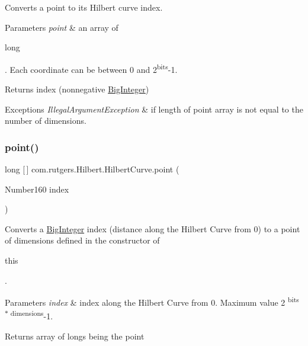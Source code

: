 Converts a point to its Hilbert curve index.


\begin{DoxyParams}{Parameters}
{\em point} & an array of
\begin{DoxyCode}
\textcolor{keywordtype}{long} 
\end{DoxyCode}
 . Each coordinate can be between 0 and 2\textsuperscript{bits}-\/1. \\
\hline
\end{DoxyParams}
\begin{DoxyReturn}{Returns}
index (nonnegative \hyperlink{}{Big\+Integer}) 
\end{DoxyReturn}

\begin{DoxyExceptions}{Exceptions}
{\em Illegal\+Argument\+Exception} & if length of point array is not equal to the number of dimensions. \\
\hline
\end{DoxyExceptions}
\mbox{\label{classcom_1_1rutgers_1_1Hilbert_1_1HilbertCurve_ad3b9f221c5c8e9bada057c09ecb4f8cd}} 
\subsubsection{\texorpdfstring{point()}{point()}\hspace{0.1cm}{\footnotesize\ttfamily [1/2]}}
{\footnotesize\ttfamily long \mbox{[}$\,$\mbox{]} com.\+rutgers.\+Hilbert.\+Hilbert\+Curve.\+point (\begin{DoxyParamCaption}\item[{Number160}]{index }\end{DoxyParamCaption})}

Converts a \hyperlink{}{Big\+Integer} index (distance along the Hilbert Curve from 0) to a point of dimensions defined in the constructor of 
\begin{DoxyCode}
\textcolor{keyword}{this} 
\end{DoxyCode}
 .


\begin{DoxyParams}{Parameters}
{\em index} & index along the Hilbert Curve from 0. Maximum value 2 \textsuperscript{bits $\ast$ dimensions}-\/1. \\
\hline
\end{DoxyParams}
\begin{DoxyReturn}{Returns}
array of longs being the point 
\end{DoxyReturn}

